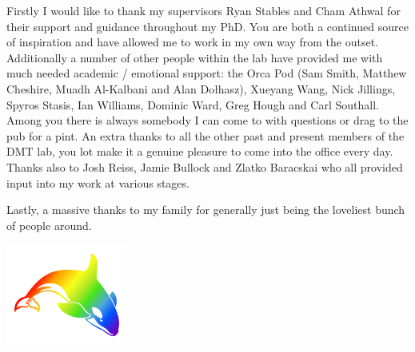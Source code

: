\begin{acknowledgements}
	Firstly I would like to thank my supervisors Ryan Stables and Cham Athwal for their support and guidance throughout
	my PhD. You are both a continued source of inspiration and have allowed me to work in my own way from the outset.
	Additionally a number of other people within the lab have provided me with much needed academic / emotional support:
	the Orca Pod (Sam Smith, Matthew Cheshire, Muadh Al-Kalbani and Alan Do\l{}hasz), Xueyang Wang, Nick Jillings,
	Spyros Stasis, Ian Williams, Dominic Ward, Greg Hough and Carl Southall. Among you there is always somebody I can
	come to with questions or drag to the pub for a pint. An extra thanks to all the other past and present members of
	the DMT lab, you lot make it a genuine pleasure to come into the office every day. Thanks also to Josh Reiss, Jamie
	Bullock and Zlatko Baracskai who all provided input into my work at various stages.

	Lastly, a massive thanks to my family for generally just being the loveliest bunch of people around.

	\begin{center}
		\includegraphics[width=0.3\textwidth]{Images/orca.pdf}
	\end{center}
\end{acknowledgements}

\tableofcontents
\listoffigures
\listoftables
{}
\printglossaries
\cleardoublepage
